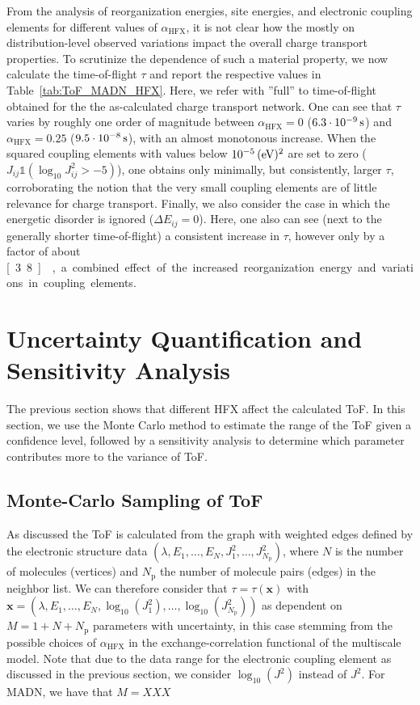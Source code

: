 \documentclass[%
 reprint,
superscriptaddress,
 amsmath,amssymb,
 aps,
prb,
floatfix
]{revtex4-2}
\newcommand{\bjoern}[2]{{\color{blue}{{\bf #1} #2}}}
\newcommand{\ahfx}{\ensuremath{\alpha_\text{HFX}}\xspace}
\begin{document}
From the analysis of reorganization energies, site energies, and electronic coupling elements for different values of \ahfx, it is not clear how the mostly on distribution-level observed variations impact the overall charge transport properties. To scrutinize the dependence of such a material property, we now calculate the time-of-flight $\tau$ and report the respective values in Table~\ref{tab:ToF_MADN_HFX}. Here, we refer with ''full'' to time-of-flight obtained for the the as-calculated charge transport network. One can see that $\tau$ varies by roughly one order of magnitude between $\ahfx=0$ ($\unit[6.3\cdot 10^{-9}]{s}$) and $\ahfx=0.25$ ($\unit[9.5\cdot 10^{-8}]{s}$), with an almost monotonous increase. When the squared coupling elements with values below $\unit[10^{-5}]{(eV)^2}$ are set to zero ($J_{ij} \mathbb{1}(\log_{10} J^2_{ij} > -5)$), one obtains only minimally, but consistently, larger $\tau$, corroborating the notion that the very small coupling elements are of little relevance for charge transport. Finally, we also consider the case in which the energetic disorder is ignored ($\Delta E_{ij}=0$). Here, one also can see (next to the generally shorter time-of-flight) a consistent increase in $\tau$, however only by a factor of about \unit[3.8]{}, a combined effect of the increased reorganization energy and variations in coupling elements.




\section{Uncertainty Quantification and Sensitivity Analysis}
\label{sec:UQ}
The previous section shows that different HFX affect the calculated ToF. In this section, we use the Monte Carlo method to estimate the range of the ToF given a confidence level, followed by a sensitivity analysis to determine which parameter contributes more to the variance of ToF. 

\subsection{Monte-Carlo Sampling of ToF}
As discussed the ToF is calculated from the graph with weighted edges defined by the electronic structure data $(\lambda, E_1,\ldots,E_N, J_1^2,\ldots,J_{N_\text{p}}^2)$, where $N$ is the number of molecules (vertices) and $N_\text{p}$ the number of molecule pairs (edges) in the neighbor list. We can therefore consider that $\tau = \tau(\mathbf{x})$ with $\mathbf{x}=(\lambda, E_1,\ldots,E_N, \log_{10}(J_1^2),\ldots,\log_{10}(J_{N_\text{p}}^2))$ as dependent on $M = 1+N+N_\text{p}$ parameters with uncertainty, in this case stemming from the possible choices of \ahfx in the exchange-correlation functional of the multiscale model. Note that due to the data range for the electronic coupling element as discussed in the previous section, we consider $\log_{10}(J^2)$ instead of $J^2$. For MADN, we have that $M=XXX$ \bjoern{ADD:}{how many pairs?}
\end{document}
